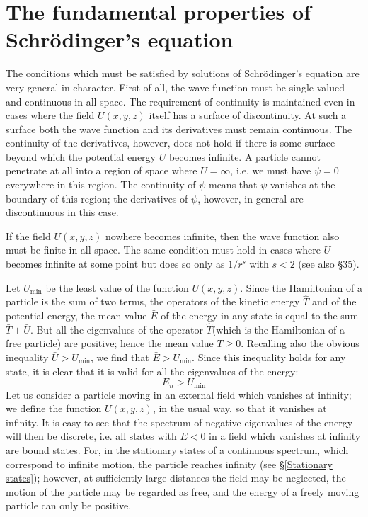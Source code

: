 \section{The fundamental properties of Schr\"odinger's equation}\label{The fundamental properties of Schr\"odinger's equation}
The conditions which must be satisfied by solutions of Schrödinger’s equation are very general in character. First of all, the wave function must be single-valued and continuous in all space. The requirement of continuity is maintained even in cases where the field $ U(x, y, z) $ itself has a surface of discontinuity. At such a surface both the wave function and its derivatives must remain continuous. The continuity of the derivatives, however, does not hold if there is some surface beyond which the potential energy $ U $ becomes infinite. A particle cannot penetrate at all into a region of space where $ U=\infty $, i.e. we must have $ \psi = 0 $ everywhere in this region. The continuity of $\psi$ means that $\psi$ vanishes at the boundary of this region; the derivatives of $\psi$, however, in general are discontinuous in this case.

If the field $ U(x, y, z) $ nowhere becomes infinite, then the wave function also must be finite in all space. The same condition must hold in cases where $ U $ becomes infinite at some point but does so only as $ 1/r^s $ with $ s < 2 $ (see also \S35).

Let $ U_{\mathrm{min}} $ be the least value of the function $ U(x, y, z) $. Since the Hamiltonian of a particle is the sum of two terms, the operators of the kinetic energy $ \hat{T} $ and of the potential energy, the mean value $ \bar{E} $ of the energy in any state is equal to the sum $ \bar{T}+\bar{U} $. But all the eigenvalues of the operator $ \hat{T} $(which is the Hamiltonian of a free particle) are positive; hence the mean value $ \bar{T}\geqslant0 $. Recalling also the obvious inequality $ \bar{U}> U_{\mathrm{min}} $, we find that $ \bar{E}> U_{\mathrm{min}} $. Since this inequality holds for any state, it is clear that it is valid for all the eigenvalues of the energy:
\begin{equation}\label{18.1}
E_n>U_{\mathrm{min}}
\end{equation}
Let us consider a particle moving in an external field which vanishes at infinity; we define the function $ U(x, y, z) $, in the usual way, so that it vanishes at infinity. It is easy to see that the spectrum of negative eigenvalues of the energy will then be discrete, i.e. all states with $ E < 0 $ in a field which vanishes at infinity are bound states. For, in the stationary states of a continuous spectrum, which correspond to infinite motion, the particle reaches infinity (see \S\ref{Stationary states}); however, at sufficiently large distances the field may be neglected, the motion of the particle may be regarded as free, and the energy of a freely moving particle can only be positive.

